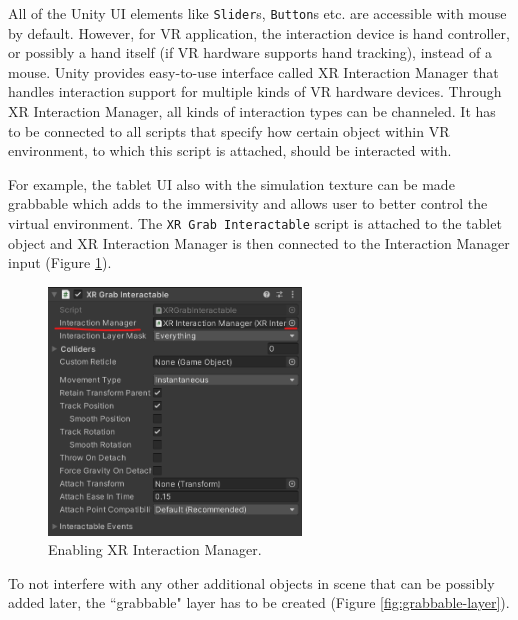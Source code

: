 All of the Unity UI elements like \texttt{Slider}s, \texttt{Button}s etc. are accessible with mouse by default. However, for VR application, the interaction device is hand controller, or possibly a hand itself (if VR hardware supports hand tracking), instead of a mouse. Unity provides easy-to-use interface called XR Interaction Manager that handles interaction support for multiple kinds of VR hardware devices. Through XR Interaction Manager, all kinds of interaction types can be channeled. It has to be connected to all scripts that specify how certain object within VR environment, to which this script is attached, should be interacted with.

For example, the tablet UI also with the simulation texture can be made grabbable which adds to the immersivity and allows user to better control the virtual environment. The \texttt{XR Grab Interactable} script is attached to the tablet object and XR Interaction Manager is then connected to the Interaction Manager input (Figure \ref{fig:enable-xr-interaction-manager}).

\begin{figure}[!ht]
	\centering
	\includegraphics[width=0.6\textwidth]{figures/xr-grab-interactable-script.png}
	\caption{Enabling XR Interaction Manager.}
	\label{fig:enable-xr-interaction-manager}
\end{figure}

To not interfere with any other additional objects in scene that can be possibly added later, the ``grabbable" layer has to be created (Figure \ref{fig:grabbable-layer}).

